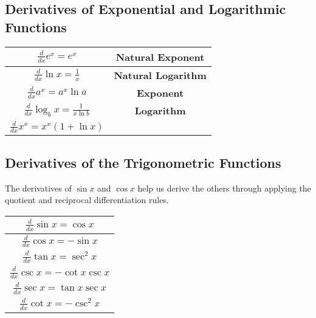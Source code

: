    \subsection{Derivatives of Exponential and Logarithmic Functions}
        \begin{center}
            \begin{tabular}{|c|c|}
                \hline
                $\frac{d}{dx}e^x=e^x$ & \textbf{Natural Exponent} \\
                \hline
                $\frac{d}{dx}\ln{x}=\frac{1}{x}$ & \textbf{Natural Logarithm} \\
                \hline
                $\frac{d}{dx}a^x=a^x\ln{a}$ & \textbf{Exponent} \\
                \hline
                $\frac{d}{dx}\log_b{x}=\frac{1}{x\ln{b}}$ & \textbf{Logarithm} \\
                \hline
                $\frac{d}{dx}x^x=x^x(1+\ln{x})$ & \\
                \hline
            \end{tabular}
        \end{center}


    \pagebreak
    \subsection{Derivatives of the Trigonometric Functions}
        The derivatives of $\sin{x}$ and $\cos{x}$ help us derive the others through applying
        the quotient and reciprocal differentiation rules. \\

        \begin{center}
            \begin{tabular}{|c|}
                \hline
                $\frac{d}{dx}\sin{x}=\cos{x}$ \\
                \hline
                $\frac{d}{dx}\cos{x}=-\sin{x}$ \\
                \hline
                $\frac{d}{dx}\tan{x}=\sec^2{x}$ \\
                \hline
                $\frac{d}{dx}\csc{x}=-\cot{x}\csc{x}$ \\
                \hline
                $\frac{d}{dx}\sec{x}=\tan{x}\sec{x}$ \\
                \hline
                $\frac{d}{dx}\cot{x}=-\csc^2{x}$ \\
                \hline
            \end{tabular}
        \end{center}


